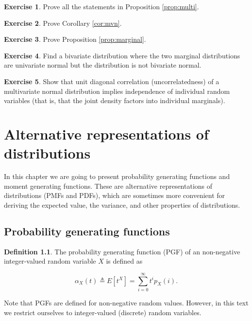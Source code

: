 \documentclass{book}
\theoremstyle{plain}%
\theoremstyle{definition}
\newtheorem{definition}{Definition}[section]
\newtheorem{exercise}{Exercise}[chapter]
\begin{document}
\begin{exercise}
Prove all the statements in Proposition \ref{prop:multi}.
\end{exercise}

\begin{exercise}
Prove Corollary \ref{cor:mvn}.
\end{exercise}

\begin{exercise}
Prove Proposition \ref{prop:marginal}.
\end{exercise}

\begin{exercise}
Find a bivariate distribution where the two marginal distributions are univariate normal but the distribution is not bivariate normal.\label{ex:mvn}
\end{exercise}

\begin{exercise}
Show that unit diagonal correlation (uncorrelatedness) of a multivariate normal distribution implies independence of individual random variables (that is, that the joint density factors into individual marginals).
\end{exercise}


\chapter{Alternative representations of distributions}

In this chapter we are going to present probability generating functions and moment generating functions. These are alternative representations of distributions (PMFs and PDFs), which are sometimes more convenient for deriving the expected value, the variance, and other properties of distributions.

\section{Probability generating functions}

\begin{definition}
The probability generating function (PGF) of an non-negative integer-valued random variable $X$ is defined as

$$\alpha_X(t) \triangleq E[t^X] = \sum_{i = 0}^\infty t^ip_X(i) .$$
\end{definition}

Note that PGFs are defined for non-negative random values. However, in this text we restrict ourselves to integer-valued (discrete) random variables.
\end{document}
